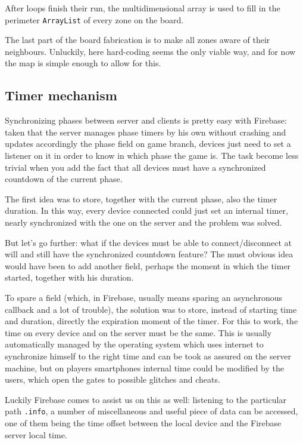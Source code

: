 			After loops finish their run, the multidimensional array is used to fill in the perimeter \lstinline|ArrayList| of every zone on the board.
			
			The last part of the board fabrication is to make all zones aware of their neighbours. Unluckily, here hard-coding seems the only viable way, and for now the map is simple enough to allow for this.
			
		\subsection{Timer mechanism}\label{focus:timer}
		
			Synchronizing phases between server and clients is pretty easy with Firebase: taken that the server manages phase timers by his own without crashing and updates accordingly the phase field on game branch, devices just need to set a listener on it in order to know in which phase the game is.
			The task become less trivial when you add the fact that all devices must have a synchronized countdown of the current phase.
			
			The first idea was to store, together with the current phase, also the timer duration.
			In this way, every device connected could just set an internal timer, nearly synchronized with the one on the server and the problem was solved.
			
			But let's go further: what if the devices must be able to connect/disconnect at will and still have the synchronized countdown feature?
			The must obvious idea would have been to add another field, perhaps the moment in which the timer started, together with his duration.
			
			To spare a field (which, in Firebase, usually means sparing an asynchronous callback and a lot of trouble), the solution was to store, instead of starting time and duration, directly the expiration moment of the timer.
			For this to work, the time on every device and on the server must be the same. This is usually automatically managed by the operating system which uses internet to synchronize himself to the right time and can be took as assured on the server machine, but on players smartphones internal time could be modified by the users, which open the gates to possible glitches and cheats.
			
			Luckily Firebase comes to assist us on this as well: listening to the particular path \lstinline|.info|, a number of miscellaneous and useful piece of data can be accessed, one of them being the time offset between the local device and the Firebase server local time.
			
